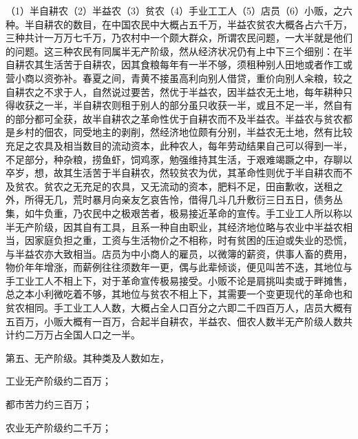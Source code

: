 （1）半自耕农（2）半益农（3）贫农（4）手业工工人（5）店员（6）小贩，之六种。半自耕农的数目，在中国农民中大概占五千万，半益农贫农大概各占六千万，三种共计一万万七千万，乃农村中一个颇大群众，所谓农民问题，一大半就是他们的问题。这三种农民有同属半无产阶级，然从经济状况仍有上中下三个细别：在半自耕农其生活苦于自耕农，因其食粮每年有一半不够，须租种别人田地或者作工或营小商以资弥补。春夏之间，青黄不接虽高利向别人借贷，重价向别人籴粮，较之自耕农之不求于人，自然说过要苦，然优于半益农，因半益农无土地，每年耕种只得收获之一半，半自耕农则租于别人的部分虽只收获一半，或且不足一半，然自有的部分都可全获，故半自耕农之革命性优于自耕农而不及半益农。半益农与贫农都是乡村的佃农，同受地主的剥削，然经济地位颇有分别，半益农无土地，然有比较充足之农具及相当数目的流动资本，此种农人，每年劳动结果自己可以得到一半，不足部分，种杂粮，捞鱼虾，饲鸡豕，勉强维持其生活，于艰难竭蹶之中，存聊以卒岁，想，故其生活苦于半自耕农，然较贫农为优，其革命性则优于半自耕农而不及贫农。贫农之无充足的农具，又无流动的资本，肥料不足，田亩歉收，送租之外，所得无几，荒时暴月向亲友乞哀告怜，借得几斗几升敷衍三日五日，债务丛集，如牛负重，乃农民中之极艰苦者，极易接近革命的宣传。手工业工人所以称以半无产阶级，因其自有工具，且系一种自由职业，其经济地位略与农业中半益农相当，因家庭负担之重，工资与生活物价之不相称，时有贫困的压迫或失业的恐慌，与半益农亦大致相当。店员为中小商人的雇员，以微簿的薪资，供事人畜的费用，物价年年增涨，而薪例往往须数年一更，偶与此辈倾谈，便见叫苦不迭，其地位与手工业工人不相上下，对于革命宣传极易接受。小贩不论是肩挑叫卖或于畔摊售，总之本小利微吃着不够，其地位与贫农不相上下，其需要一个变更现代的革命也和贫农相同。手工业工人人数，大概占全人口百分之六即二千四百万人，店员大概有五百万，小贩大概有一百万，合起半自耕农，半益农、佃农人数半无产阶级人数共计约二万万占全国人口之一半。

第五、无产阶级。其种类及人数如左，

工业无产阶级约二百万；

都市苦力约三百万；

农业无产阶级约二千万；

